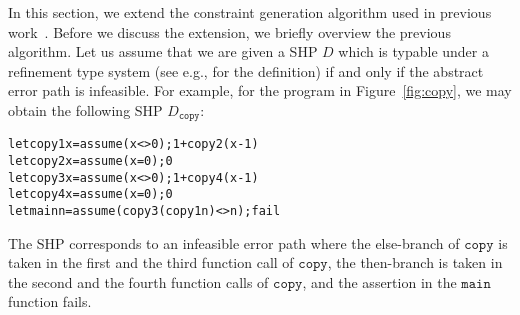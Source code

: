 In this section, we extend the constraint generation algorithm used in 
previous work~\cite{Unno2009,Terauchi2010,KobayashiPLDI2011}.  Before we 
discuss the extension, we briefly overview the previous algorithm.  Let 
us assume that we are given a SHP \(D\) which is typable under a 
refinement type system (see e.g., \cite{Unno2009} for the definition) if 
and only if the abstract error path is infeasible.  For example, for the 
program in Figure~\ref{fig:copy}, we may obtain the following SHP 
\(D_{\texttt{copy}}\):
\begin{alltt}
let copy1 x = assume (x<>0); 1 + copy2 (x-1)
let copy2 x = assume (x=0); 0
let copy3 x = assume (x<>0); 1 + copy4 (x-1)
let copy4 x = assume (x=0); 0
let main n = assume (copy3 (copy1 n) <> n); fail
\end{alltt}
The SHP corresponds to an infeasible error path where the else-branch of 
\(\texttt{copy}\) is taken in the first and the third function call of 
\(\texttt{copy}\), the then-branch is taken in the second and the fourth 
function calls of \(\texttt{copy}\), and the assertion in the 
\(\texttt{main}\) function fails.

